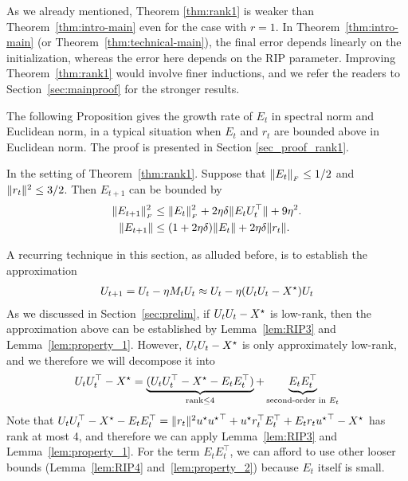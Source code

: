 As we already mentioned, Theorem \ref{thm:rank1} is weaker than Theorem~\ref{thm:intro-main} even for the case with $r=1$. In Theorem~\ref{thm:intro-main} (or Theorem~\ref{thm:technical-main}), the final error depends linearly on the initialization, whereas the error here depends on the RIP parameter. Improving Theorem~\ref{thm:rank1} would involve finer inductions, and we refer the readers to Section~\ref{sec:mainproof} for the stronger results.

The following Proposition gives the growth rate of $E_t$ in spectral norm and Euclidean norm, in a typical situation when $E_t$ and $r_t$ are bounded above in Euclidean norm.
The proof is presented in Section \ref{sec_proof_rank1}.

\begin{prop}\label{prop:rank1_Et}
	In the setting of Theorem~\ref{thm:rank1}. Suppose that $\|E_t\|_{_{F}} \le 1/2$ and $\|r_t\|^2 \le 3/2$.
	Then $E_{t+1}$ can be bounded by
	\begin{align}
	\|E_{t+1}\|_{_{F}}^2 &\le \|E_t\|_{_{F}}^2 + 2\eta \delta \|E_t U_t^{\top}\|  + 9\eta^2 \label{eqn:etfro}.\\
	\|E_{t+1}\| & \le (1 + 2\eta\delta) \|E_t\| + 2\eta\delta \|r_t\|. \nonumber
	\end{align}
\end{prop}

A recurring technique in this section, as alluded before, is to establish the approximation
\begin{align*}
U_{t+1} = U_t - \eta M_t U_t \approx U_t - \eta (U_tU_t-{X}^\star)U_t
\end{align*}
As we discussed in Section~\ref{sec:prelim}, if $U_tU_t-{X}^\star$ is low-rank, then the approximation above can be established by Lemma~\ref{lem:RIP3} and Lemma~\ref{lem:property_1}. However, $U_tU_t-{X}^\star$ is only approximately low-rank, and we therefore we will decompose it into
\begin{align}
U_t U_t^{\top} - {X}^\star = \underbrace{(U_t U_t^{\top} - {X}^\star - E_t E_t^{\top})}_{\textup{rank} \le 4} + \underbrace{E_tE_t^\top}_{\textup{second-order in $E_t$}} \label{eqn:decompose}
\end{align}
Note that $U_t U_t^{\top} - {X}^\star - E_t E_t^{\top} = \|r_t\|^2 u^\star {u^\star}^\top + u^\star r_t^\top E_t^\top + E_tr_t{u^\star}^\top - {X}^\star$ has rank at most 4, and therefore we can apply Lemma~\ref{lem:RIP3} and Lemma~\ref{lem:property_1}. For the term $E_tE_t^\top$, we can afford to use other looser bounds (Lemma~\ref{lem:RIP4} and~\ref{lem:property_2}) because $E_t$ itself is small. 

